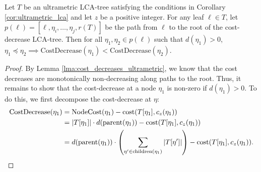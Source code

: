 \begin{lemma}
    \label{lma:cost_decreases_increase}
    Let $T$ be an ultrametric LCA-tree satisfying the conditions in Corollary \ref{cor:ultrametric_lca} and let $z$ be a positive integer. For any leaf $\ell
    \in T$, let $p(\ell) = [\ell, \eta_i, \ldots, \eta_j, r(T)]$ be the path from $\ell$ to the root of the cost-decrease LCA-tree.  Then for all $\eta_1,
    \eta_2 \in p(\ell)$ such that $d(\eta_1) > 0$, $\eta_1 \preceq \eta_2 \implies \text{CostDecrease}(\eta_1) < \text{CostDecrease}(\eta_2)$.
\end{lemma}
\begin{proof}
    
    By Lemma \ref{lma:cost_decreases_ultrametric}, we know that the cost decreases are monotonically non-decreasing along paths to the root. Thus, it remains to
    show that the cost-decrease at a node $\eta_1$ is non-zero if $d(\eta_1) > 0$. To do this, we first decompose the cost-decrease at $\eta$:
    \begin{align*}
        \text{CostDecrease}(\eta_1) &= \text{NodeCost}(\eta_1) - \text{cost}(T[\eta_1], c_z(\eta_1)) \\
        &= |T[\eta_1]| \cdot d(\text{parent}(\eta_1)) - \text{cost}(T[\eta_1], c_z(\eta_1)) \\
        &= d(\text{parent}(\eta_1)) \cdot \left( \sum_{\eta' \in \text{children}(\eta_1)} |T[\eta']| \right) - \text{cost}(T[\eta_1], c_z(\eta_1)).
    \end{align*}


\end{proof}
